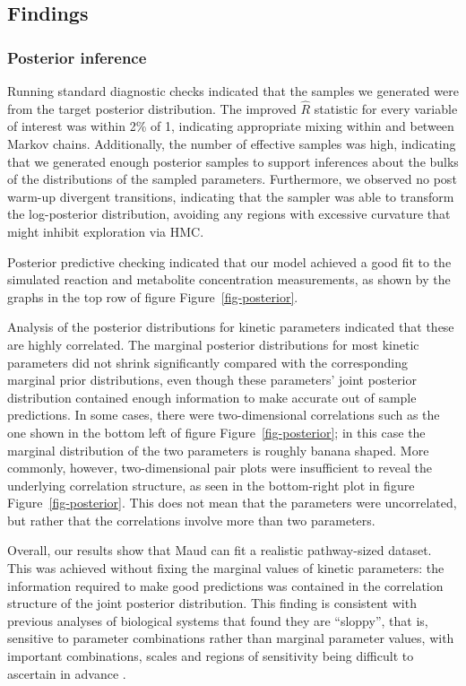 \documentclass[journal=asbcd6,manuscript=article,layout=traditional]{achemso}
\begin{document}
\hypertarget{findings}{%
\subsection{Findings}\label{findings}}

\hypertarget{posterior-inference}{%
\subsubsection{Posterior inference}\label{posterior-inference}}

Running standard diagnostic checks indicated that the samples we
generated were from the target posterior distribution. The improved
\(\hat{R}\) statistic
\citep{vehtariRankNormalizationFoldingLocalization2021} for every
variable of interest was within 2\% of 1, indicating appropriate mixing
within and between Markov chains. Additionally, the number of effective
samples was high, indicating that we generated enough posterior samples
to support inferences about the bulks of the distributions of the
sampled parameters. Furthermore, we observed no post warm-up divergent
transitions, indicating that the sampler was able to transform the
log-posterior distribution, avoiding any regions with excessive
curvature that might inhibit exploration via HMC.

Posterior predictive checking indicated that our model achieved a good
fit to the simulated reaction and metabolite concentration measurements,
as shown by the graphs in the top row of figure
Figure~\ref{fig-posterior}.

Analysis of the posterior distributions for kinetic parameters indicated
that these are highly correlated. The marginal posterior distributions
for most kinetic parameters did not shrink significantly compared with
the corresponding marginal prior distributions, even though these
parameters' joint posterior distribution contained enough information to
make accurate out of sample predictions. In some cases, there were
two-dimensional correlations such as the one shown in the bottom left of
figure Figure~\ref{fig-posterior}; in this case the marginal
distribution of the two parameters is roughly banana shaped. More
commonly, however, two-dimensional pair plots were insufficient to
reveal the underlying correlation structure, as seen in the bottom-right
plot in figure Figure~\ref{fig-posterior}. This does not mean that the
parameters were uncorrelated, but rather that the correlations involve
more than two parameters.

Overall, our results show that Maud can fit a realistic pathway-sized
dataset. This was achieved without fixing the marginal values of kinetic
parameters: the information required to make good predictions was
contained in the correlation structure of the joint posterior
distribution. This finding is consistent with previous analyses of
biological systems that found they are ``sloppy'', that is, sensitive to
parameter combinations rather than marginal parameter values, with
important combinations, scales and regions of sensitivity being
difficult to ascertain in advance
\citep{gutenkunst_2007, poirier_revising_1998}.
\end{document}

